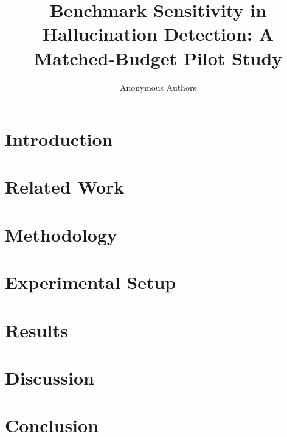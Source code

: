 \documentclass[accepted]{article}
\title{Benchmark Sensitivity in Hallucination Detection: A Matched-Budget Pilot Study}
\author{Anonymous Authors}
\begin{document}
\maketitle

\begin{abstract}

\end{abstract}

\section{Introduction}
\label{sec:introduction}


\section{Related Work}
\label{sec:related}


\section{Methodology}
\label{sec:methodology}


\section{Experimental Setup}
\label{sec:experiments}


\section{Results}
\label{sec:results}


\section{Discussion}
\label{sec:discussion}


\section{Conclusion}
\label{sec:conclusion}




\end{document}
